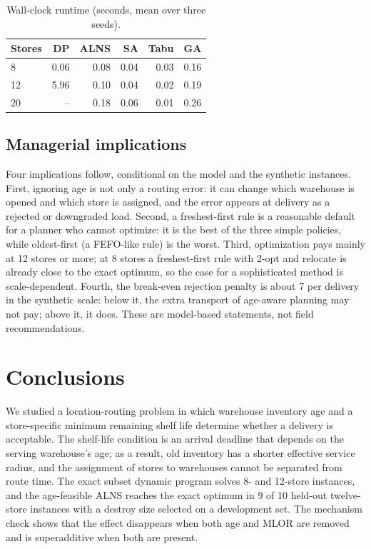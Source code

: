 \documentclass[preprint,12pt]{elsarticle}
\begin{document}
\begin{table}[t]
\centering
\caption{Wall-clock runtime (seconds, mean over three seeds).}
\label{tab:runtime}
\begin{tabular}{lrrrrr}
\toprule
Stores & DP & ALNS & SA & Tabu & GA \\
\midrule
8 & 0.06 & 0.08 & 0.04 & 0.03 & 0.16 \\
12 & 5.96 & 0.10 & 0.04 & 0.02 & 0.19 \\
20 & -- & 0.18 & 0.06 & 0.01 & 0.26 \\
\bottomrule
\end{tabular}
\end{table}

\subsection{Managerial implications}

Four implications follow, conditional on the model and the synthetic instances. First, ignoring age is not only a routing error: it can change which warehouse is opened and which store is assigned, and the error appears at delivery as a rejected or downgraded load. Second, a freshest-first rule is a reasonable default for a planner who cannot optimize: it is the best of the three simple policies, while oldest-first (a FEFO-like rule) is the worst. Third, optimization pays mainly at 12 stores or more; at 8 stores a freshest-first rule with 2-opt and relocate is already close to the exact optimum, so the case for a sophisticated method is scale-dependent. Fourth, the break-even rejection penalty is about 7 per delivery in the synthetic scale: below it, the extra transport of age-aware planning may not pay; above it, it does. These are model-based statements, not field recommendations.

\section{Conclusions}

We studied a location-routing problem in which warehouse inventory age and a store-specific minimum remaining shelf life determine whether a delivery is acceptable. The shelf-life condition is an arrival deadline that depends on the serving warehouse's age; as a result, old inventory has a shorter effective service radius, and the assignment of stores to warehouses cannot be separated from route time. The exact subset dynamic program solves 8- and 12-store instances, and the age-feasible ALNS reaches the exact optimum in 9 of 10 held-out twelve-store instances with a destroy size selected on a development set. The mechanism check shows that the effect disappears when both age and MLOR are removed and is superadditive when both are present.
\end{document}
